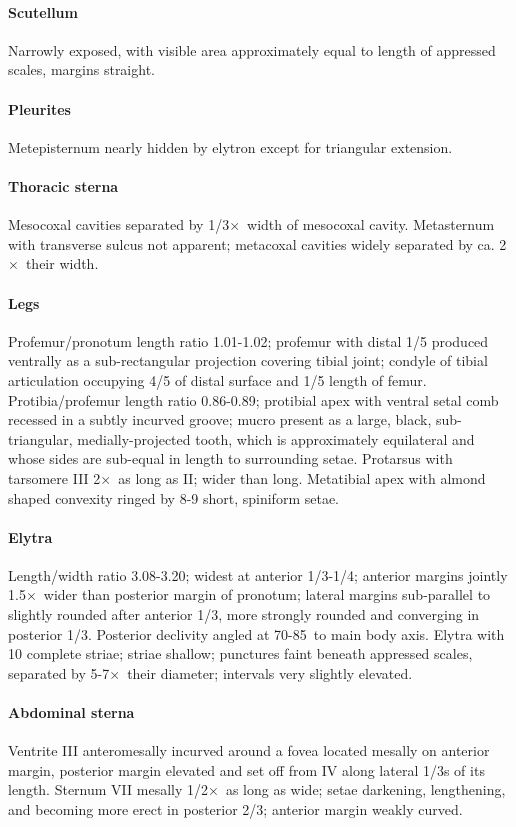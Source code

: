 \documentclass[fleqn,10pt,lineno]{wlpeerj} %
\newcommand{\td}{\textdegree~}
\newcommand{\x}{$\times$~}
\begin{document}
			\paragraph{Scutellum}
				Narrowly exposed, with visible area approximately equal to length of appressed scales, margins straight.
			\paragraph{Pleurites}
				Metepisternum nearly hidden by elytron except for triangular extension.
			\paragraph{Thoracic sterna} 
				Mesocoxal cavities separated by 1/3\x width of mesocoxal cavity. 
				Metasternum with transverse sulcus not apparent; metacoxal cavities widely separated by ca. 2\x their width.
			\paragraph{Legs}
				Profemur/pronotum length ratio 1.01-1.02; profemur with distal 1/5 produced ventrally as a sub-rectangular projection covering tibial joint; condyle of tibial articulation occupying 4/5 of distal surface and 1/5 length of femur. 
				Protibia/profemur length ratio 0.86-0.89; protibial apex with ventral setal comb recessed in a subtly incurved groove; mucro present as a large, black, sub-triangular, medially-projected tooth, which is approximately equilateral and whose sides are sub-equal in length to surrounding setae. 
				Protarsus with tarsomere III 2\x as long as II; wider than long. 
				Metatibial apex with almond shaped convexity ringed by 8-9 short, spiniform setae.
			\paragraph{Elytra}
				Length/width ratio 3.08-3.20; widest at anterior 1/3-1/4; anterior margins jointly 1.5\x wider than posterior margin of pronotum; lateral margins sub-parallel to slightly rounded after anterior 1/3, more strongly rounded and converging in posterior 1/3. 
				Posterior declivity angled at 70-85\td to main body axis. Elytra with 10 complete striae; striae shallow; punctures faint beneath appressed scales, separated by 5-7\x their diameter; intervals very slightly elevated.
			\paragraph{Abdominal sterna}
				Ventrite III anteromesally incurved around a fovea located mesally on anterior margin, posterior margin elevated and set off from IV along lateral 1/3s of its length. 
				Sternum VII mesally 1/2\x as long as wide; setae darkening, lengthening, and becoming more erect in posterior 2/3; anterior margin weakly curved.
\end{document}
